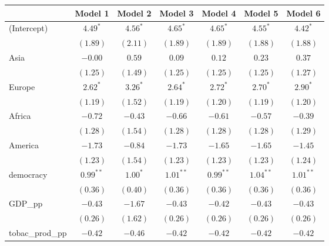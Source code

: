 
\begin{table}[!h]
\begin{center}
\begin{tabular}{l c c c c c c }
\toprule
 & Model 1 & Model 2 & Model 3 & Model 4 & Model 5 & Model 6 \\
\midrule
(Intercept)             & $4.49^{*}$   & $4.56^{*}$   & $4.65^{*}$   & $4.65^{*}$   & $4.55^{*}$   & $4.42^{*}$   \\
                        & $(1.89)$     & $(2.11)$     & $(1.89)$     & $(1.89)$     & $(1.88)$     & $(1.88)$     \\
Asia                    & $-0.00$      & $0.59$       & $0.09$       & $0.12$       & $0.23$       & $0.37$       \\
                        & $(1.25)$     & $(1.49)$     & $(1.25)$     & $(1.25)$     & $(1.25)$     & $(1.27)$     \\
Europe                  & $2.62^{*}$   & $3.26^{*}$   & $2.64^{*}$   & $2.72^{*}$   & $2.70^{*}$   & $2.90^{*}$   \\
                        & $(1.19)$     & $(1.52)$     & $(1.19)$     & $(1.20)$     & $(1.19)$     & $(1.20)$     \\
Africa                  & $-0.72$      & $-0.43$      & $-0.66$      & $-0.61$      & $-0.57$      & $-0.39$      \\
                        & $(1.28)$     & $(1.54)$     & $(1.28)$     & $(1.28)$     & $(1.28)$     & $(1.29)$     \\
America                 & $-1.73$      & $-0.84$      & $-1.73$      & $-1.65$      & $-1.65$      & $-1.45$      \\
                        & $(1.23)$     & $(1.54)$     & $(1.23)$     & $(1.23)$     & $(1.23)$     & $(1.24)$     \\
democracy               & $0.99^{**}$  & $1.00^{*}$   & $1.01^{**}$  & $0.99^{**}$  & $1.04^{**}$  & $1.01^{**}$  \\
                        & $(0.36)$     & $(0.40)$     & $(0.36)$     & $(0.36)$     & $(0.36)$     & $(0.36)$     \\
GDP\_pp                 & $-0.43$      & $-1.67$      & $-0.43$      & $-0.42$      & $-0.43$      & $-0.43$      \\
                        & $(0.26)$     & $(1.62)$     & $(0.26)$     & $(0.26)$     & $(0.26)$     & $(0.26)$     \\
tobac\_prod\_pp         & $-0.42$      & $-0.46$      & $-0.42$      & $-0.42$      & $-0.42$      & $-0.42$      \\

\end{tabular}
\end{center}
\end{table}

